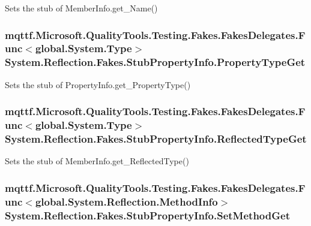 Sets the stub of Member\-Info.\-get\-\_\-\-Name()

\hypertarget{class_system_1_1_reflection_1_1_fakes_1_1_stub_property_info_a03773af771c181a60e6c404f3e4e75dc}{
\subsubsection[{Property\-Type\-Get}]{\setlength{\rightskip}{0pt plus 5cm}mqttf.\-Microsoft.\-Quality\-Tools.\-Testing.\-Fakes.\-Fakes\-Delegates.\-Func$<$global.\-System.\-Type$>$ System.\-Reflection.\-Fakes.\-Stub\-Property\-Info.\-Property\-Type\-Get}}\label{class_system_1_1_reflection_1_1_fakes_1_1_stub_property_info_a03773af771c181a60e6c404f3e4e75dc}


Sets the stub of Property\-Info.\-get\-\_\-\-Property\-Type()

\hypertarget{class_system_1_1_reflection_1_1_fakes_1_1_stub_property_info_ad5e38e90ff80c0b106bbf2f027450e43}{
\subsubsection[{Reflected\-Type\-Get}]{\setlength{\rightskip}{0pt plus 5cm}mqttf.\-Microsoft.\-Quality\-Tools.\-Testing.\-Fakes.\-Fakes\-Delegates.\-Func$<$global.\-System.\-Type$>$ System.\-Reflection.\-Fakes.\-Stub\-Property\-Info.\-Reflected\-Type\-Get}}\label{class_system_1_1_reflection_1_1_fakes_1_1_stub_property_info_ad5e38e90ff80c0b106bbf2f027450e43}


Sets the stub of Member\-Info.\-get\-\_\-\-Reflected\-Type()

\hypertarget{class_system_1_1_reflection_1_1_fakes_1_1_stub_property_info_a0ef8f108d027673911448f05882cb899}{
\subsubsection[{Set\-Method\-Get}]{\setlength{\rightskip}{0pt plus 5cm}mqttf.\-Microsoft.\-Quality\-Tools.\-Testing.\-Fakes.\-Fakes\-Delegates.\-Func$<$global.\-System.\-Reflection.\-Method\-Info$>$ System.\-Reflection.\-Fakes.\-Stub\-Property\-Info.\-Set\-Method\-Get}}\label{class_system_1_1_reflection_1_1_fakes_1_1_stub_property_info_a0ef8f108d027673911448f05882cb899}


